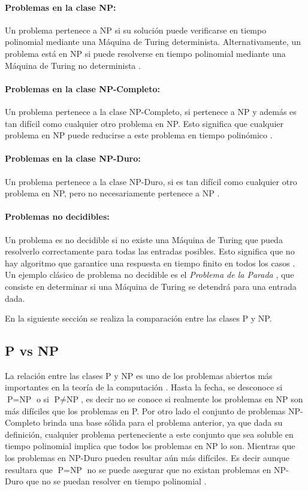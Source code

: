\documentclass[12pt]{article}
\begin{document}
\paragraph{Problemas en la clase NP:}
Un problema pertenece a NP si su solución puede verificarse en tiempo polinomial mediante una Máquina de Turing determinista. Alternativamente, un problema está en NP si puede resolverse en tiempo polinomial mediante una Máquina de Turing no determinista \cite{authomataTheory}.

\paragraph{Problemas en la clase NP-Completo:}
Un problema pertenece a la clase NP-Completo, si pertenece a NP y además es tan difícil como cualquier otro problema en NP. Esto significa que cualquier problema en NP puede reducirse a este problema en tiempo polinómico \cite{authomataTheory}.

\paragraph{Problemas en la clase NP-Duro:}
Un problema pertenece a la clase NP-Duro, si es tan difícil como cualquier otro problema en NP, pero no
necesariamente pertenece a NP \cite{authomataTheory}.

\paragraph{Problemas no decidibles:}
Un problema es no decidible si no existe una Máquina de Turing que pueda resolverlo correctamente para todas las entradas posibles. Esto significa que no hay algoritmo que garantice una respuesta en tiempo finito en todos los casos \cite{authomataTheory}. Un ejemplo clásico de problema no decidible es el \textit{Problema de la Parada} \cite{authomataTheory}, que consiste en determinar si una Máquina de Turing se detendrá para una entrada dada. 

En la siguiente sección se realiza la comparación entre las clases P y NP.

\subsection{P vs NP}

La relación entre las clases P y NP es uno de los problemas abiertos más importantes en la teoría de la
computación \cite{authomataTheory}. Hasta la fecha, se desconoce si $\text{P} = \text{NP}$ o si $\text{P} \neq \text{NP}$,
es decir no se conoce si realmente los problemas en NP son más difíciles que los problemas en P. Por otro
lado el conjunto de problemas NP-Completo brinda una base sólida para el problema anterior, ya que dada su
definición, cualquier problema perteneciente a este conjunto que sea soluble en tiempo polinomial
implica que todos los problemas en NP lo son. Mientras que los problemas en NP-Duro pueden resultar aún más
difíciles. Es decir aunque resultara que $\text{P} = \text{NP}$ no se puede asegurar que no existan problemas
en NP-Duro que no se puedan resolver en tiempo polinomial \cite{authomataTheory}.
\end{document}
